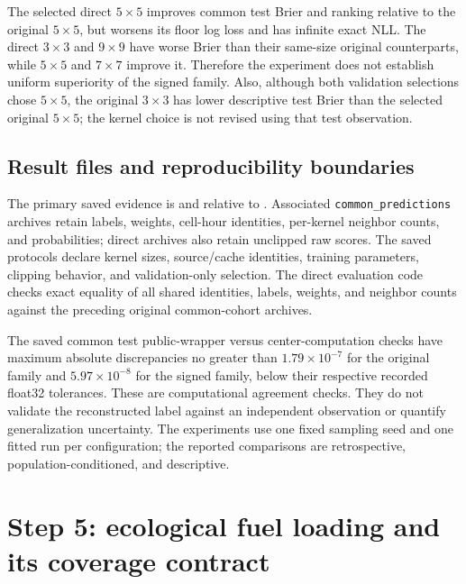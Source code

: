 \documentclass[11pt,a4paper]{article}
\begin{document}
The selected direct $5\times5$ improves common test Brier and ranking relative
to the original $5\times5$, but worsens its floor log loss and has infinite
exact NLL. The direct $3\times3$ and $9\times9$ have worse Brier than their
same-size original counterparts, while $5\times5$ and $7\times7$ improve it.
Therefore the experiment does not establish uniform superiority of the signed
family. Also, although both validation selections chose $5\times5$, the
original $3\times3$ has lower descriptive test Brier than the selected original
$5\times5$; the kernel choice is not revised using that test observation.

\subsection{Result files and reproducibility boundaries}

The primary saved evidence is
and
relative to . Associated
\texttt{common\_predictions} archives retain labels, weights, cell-hour
identities, per-kernel neighbor counts, and probabilities; direct archives
also retain unclipped raw scores. The saved protocols declare kernel sizes,
source/cache identities, training parameters, clipping behavior, and
validation-only selection. The direct evaluation code checks exact equality
of all shared identities, labels, weights, and neighbor counts against the
preceding original common-cohort archives.

The saved common test public-wrapper versus center-computation checks have
maximum absolute discrepancies no greater than $1.79\times10^{-7}$ for the
original family and $5.97\times10^{-8}$ for the signed family, below their
respective recorded float32 tolerances. These are computational agreement
checks. They do not validate the reconstructed label against an independent
observation or quantify generalization uncertainty. The experiments use one
fixed sampling seed and one fitted run per configuration; the reported
comparisons are retrospective, population-conditioned, and descriptive.

\section{Step 5: ecological fuel loading and its coverage contract}
\label{sec:ecological-fuel}
\end{document}
